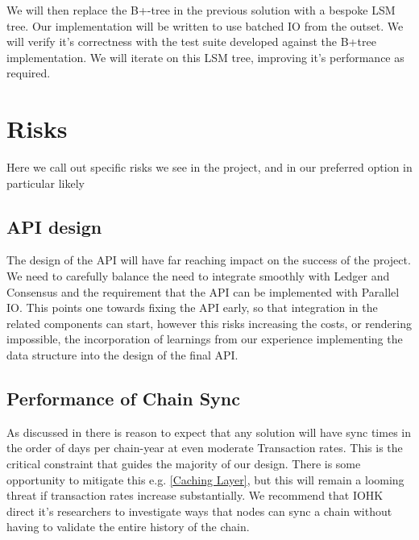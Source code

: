 \documentclass[11pt,a4paper]{article}
\begin{document}
We will then replace the B+-tree in the previous solution with a bespoke LSM tree.
Our implementation will be written to use batched IO from the outset. We will
verify it's correctness with the test suite developed against the B+tree
implementation. We will iterate on this LSM tree, improving it's performance
as required.

\section{Risks}

Here we call out specific risks we see in the project, and in our preferred option in particular
likely

\subsection{API design}
The design of the API will have far reaching impact on the success of the
project. We need to carefully balance the need to integrate smoothly with Ledger
and Consensus and the requirement that the API can be implemented with Parallel
IO. This points one towards fixing the API early, so that integration in the
related components can start, however this risks increasing the costs, or
rendering impossible, the incorporation of learnings from our experience
implementing the data structure into the design of the final API.

\subsection{Performance of Chain Sync}
As discussed in  there is reason to expect that any solution
will have sync times in the order of days per chain-year at even moderate
Transaction rates. This is the critical constraint that guides the majority of
our design. There is some opportunity to mitigate this e.g. \ref{Caching Layer},
but this will remain a looming threat if transaction rates increase
substantially. We recommend that IOHK direct it's researchers to investigate
ways that nodes can sync a chain without having to validate the entire history
of the chain.



\end{document}
